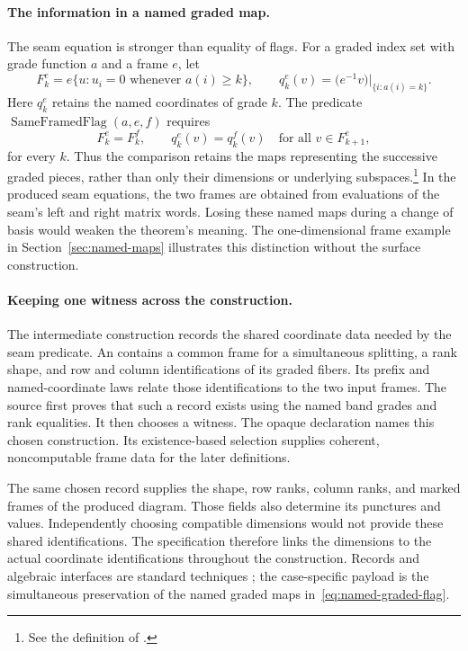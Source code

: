 \paragraph{The information in a named graded map.}
The seam equation is stronger than equality of flags. For a graded index
set with grade function $a$ and a frame $e$, let
\[
  F_k^e=e\{u:u_i=0\text{ whenever }a(i)\geq k\},
  \qquad q_k^e(v)=\bigl(e^{-1}v\bigr)|_{\{i:a(i)=k\}}.
\]
Here $q_k^e$ retains the named coordinates of grade $k$. The predicate
$\operatorname{SameFramedFlag}(a,e,f)$ requires
\begin{equation}
  F_k^e=F_k^f,\qquad
  q_k^e(v)=q_k^f(v)\quad\text{for all }v\in F_{k+1}^e,
  \label{eq:named-graded-flag}
\end{equation}
for every $k$. Thus the comparison retains the maps representing the
successive graded pieces, rather than only their dimensions or underlying
subspaces.\footnote{See the definition of
\href{https://github.com/openai/math/blob/fd4aeeb2ee4fc729c18d98444fed42fd0529eeeb/lean/OAI/AlgebraicGeometry/CharacterVarieties/Foundation/Flags.lean\#L155-L160}{}.}
In the produced seam equations, the two frames are obtained
from evaluations of the seam's left and right matrix words. Losing these
named maps during a change of basis would weaken the theorem's meaning.
The one-dimensional frame example in Section~\ref{sec:named-maps}
illustrates this distinction without the surface construction.

\paragraph{Keeping one witness across the construction.}
The intermediate construction records the shared coordinate data needed by the seam predicate. An  contains a common frame for a
simultaneous splitting, a rank shape, and row and column identifications
of its graded fibers. Its prefix and named-coordinate laws relate those
identifications to the two input frames. The source first proves that
such a record exists using the named band grades and rank equalities.
It then chooses a witness. The opaque declaration  names this chosen construction. Its existence-based selection supplies coherent, noncomputable frame data for the later definitions.

The same chosen record supplies the shape, row ranks, column ranks, and marked frames of the produced diagram. Those fields also
determine its punctures and values. Independently choosing compatible
dimensions would not provide these shared identifications. The specification therefore links the dimensions to the actual coordinate identifications throughout the construction. Records and algebraic interfaces are
standard techniques \citep{GarillotEtAl2009,Baanen2022}; the case-specific
payload is the simultaneous preservation of the named graded maps
in~\eqref{eq:named-graded-flag}.

